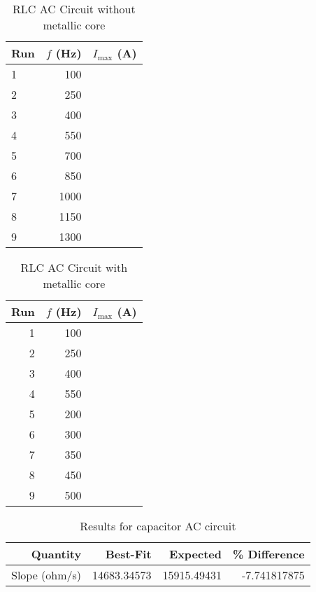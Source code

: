 \begin{table}[ht]
	\begin{center}
		\begin{tabular}{|l|r|r|}\hline
			Run & $f$ (Hz) & $I_{\text{max}}$ (A) \\
			\hline
			1 & 100 & \\
			2 & 250 & \\
			3 & 400 & \\
			4 & 550 & \\
			5 & 700 & \\
			6 & 850 & \\
			7 & 1000 & \\
			8 & 1150 & \\
			9 & 1300 & \\
			\hline
		\end{tabular}
	\end{center}
	\caption{RLC AC Circuit without metallic core}
	\label{table.RLC}
\end{table}
\begin{table}[ht]
	\begin{center}
		\begin{tabular}{|r|r|r|}\hline
			Run & $f$ (Hz) & $I_{\text{max}}$ (A) \\
			\hline
			1 & 100 & \\
			2 & 250 & \\
			3 & 400 & \\
			4 & 550 & \\
			5 & 200 & \\
			6 & 300 & \\
			7 & 350 & \\
			8 & 450 & \\
			9 & 500 & \\
			\hline
		\end{tabular}
	\end{center}
	\caption{RLC AC Circuit with metallic core}
	\label{table.RLCcore}
\end{table}
\begin{table}[ht]
	\begin{center}
		\begin{tabular}{|r|r|r|r|}
			\hline
			Quantity & Best-Fit & Expected & \% Difference \\
			\hline
			Slope (ohm/s) & 14683.34573 & 15915.49431 & -7.741817875 \\
			\hline
		\end{tabular}
	\end{center}
	\caption{Results for capacitor AC circuit}
	\label{table.results.C}
\end{table}
